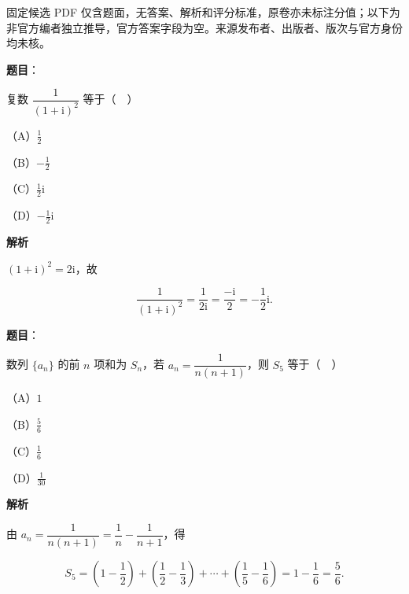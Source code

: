 

\begin{gktip}
固定候选 PDF 仅含题面，无答案、解析和评分标准，原卷亦未标注分值；以下为非官方编者独立推导，官方答案字段为空。来源发布者、出版者、版次与官方身份均未核。
\end{gktip}

\begin{answer}

\textbf{题目}：

复数 $\dfrac1{(1+\mathrm i)^2}$ 等于（　）

（A）$\frac12$

（B）$-\frac12$

（C）$\frac12\mathrm i$

（D）$-\frac12\mathrm i$

\textbf{解析}

$(1+\mathrm i)^2=2\mathrm i$，故

\nopagebreak[4]
\[\frac1{(1+\mathrm i)^2}=\frac1{2\mathrm i}=\frac{-\mathrm i}2=-\frac12\mathrm i.\]


\end{answer}
\begin{answer}

\textbf{题目}：

数列 $\{a_n\}$ 的前 $n$ 项和为 $S_n$，若 $a_n=\dfrac1{n(n+1)}$，则 $S_5$ 等于（　）

（A）$1$

（B）$\frac56$

（C）$\frac16$

（D）$\frac1{30}$

\textbf{解析}

由 $a_n=\dfrac1{n(n+1)}=\dfrac1n-\dfrac1{n+1}$，得

\nopagebreak[4]
\[S_5=\left(1-\frac12\right)+\left(\frac12-\frac13\right)+\cdots+\left(\frac15-\frac16\right)=1-\frac16=\frac56.\]


\end{answer}
